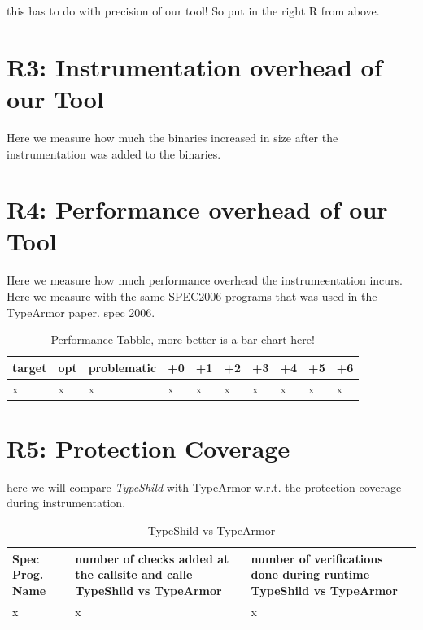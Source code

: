 this has to do with precision of our tool! So put in the right R from above.


\section{R3: Instrumentation overhead of our Tool}
\label{R4: Instrumentation overhead of our Tool}
Here we measure how much the binaries increased in size after the instrumentation was added to the binaries.

\section{R4: Performance overhead of our Tool}
\label{R3: Performance overhead of our Tool}
Here we measure how much performance overhead the instrumeentation incurs.
Here we measure with the same SPEC2006 programs that was used in the TypeArmor paper.
spec 2006.

\begin{table}[H]
\centering
\caption{Performance Tabble, more better is a bar chart here!}
\label{Integer overflow bug detection in CWE-190}
\begin{tabular}{|l|l|l|l|l|l|l|l|l|l|} \hline
\textbf{target}  & \textbf{opt}     & \textbf{problematic}    &\textbf{+0} & \textbf{+1}  & \textbf{+2} &\textbf{+3} &\textbf{+4} &\textbf{+5} &\textbf{+6}  \\ \hline 
x                &x                 &x                        &x           &x             &x            &x           &x           &x           &x            \\ \hline

\end{tabular}
\end{table}


\section{R5: Protection Coverage}
\label{R5: Protection Coverage}
here we will compare \textit{TypeShild} with TypeArmor w.r.t. the protection coverage
during instrumentation.

\begin{table}[H]
\centering
\caption{TypeShild vs TypeArmor}
\label{Integer overflow bug detection in CWE-190}
\begin{tabular}{|l|l|l|} \hline
\textbf{Spec Prog. Name}  & \textbf{number of checks added at the callsite  and calle TypeShild vs TypeArmor}     & \textbf{number of verifications done during runtime TypeShild vs TypeArmor} \\ \hline 
x                         &x                                                                                      &x                     \\ \hline

\end{tabular}
\end{table}

